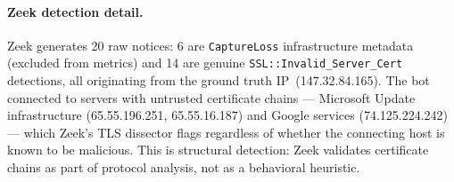 \documentclass[11pt,a4paper]{article}
\begin{document}
    \paragraph{Zeek detection detail.}
    Zeek generates 20 raw notices: 6 are \texttt{CaptureLoss} infrastructure metadata
    (excluded from metrics) and 14 are genuine \texttt{SSL::Invalid\_Server\_Cert}
    detections, all originating from the ground truth IP~(147.32.84.165). The bot
    connected to servers with untrusted certificate chains --- Microsoft Update
    infrastructure (65.55.196.251, 65.55.16.187) and Google services
    (74.125.224.242) --- which Zeek's TLS dissector flags regardless of whether the
    connecting host is known to be malicious. This is structural detection: Zeek
    validates certificate chains as part of protocol analysis, not as a behavioral
    heuristic.
\end{document}
